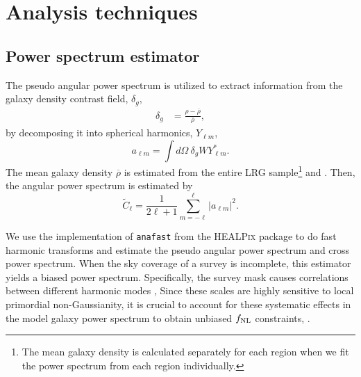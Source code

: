 \section{Analysis techniques}
\label{sec:method} 





\subsection{Power spectrum estimator}
The pseudo angular power spectrum \citep{hivon2002master} is utilized to extract information from the galaxy density contrast field, $\delta_{g}$, 
\begin{align}\label{eq:delta}
    \delta_{g} &= \frac{\rho- \overline{\rho}}{\overline{\rho}},
\end{align}
by decomposing it into spherical harmonics, $Y_{\ell m}$,
\begin{equation}
        a_{\ell m} = \int d\Omega ~ \delta_{g} W Y^{*}_{\ell m}.
\end{equation}
The mean galaxy density $\overline{\rho}$ is estimated from the entire LRG sample\footnote{The mean galaxy density is calculated separately for each region when we fit the power spectrum from each region individually.} and . Then, the angular power spectrum is estimated by
\begin{equation}\label{eq:pusedocell}
        \tilde{C}_{\ell} = \frac{1}{2\ell +1} \sum_{m=-\ell}^{\ell} |a_{\ell m}|^{2}.
\end{equation}

We use the implementation of \texttt{anafast} from the \textsc{HEALPix} package \citep{gorski2005healpix} to do fast harmonic transforms and estimate the pseudo angular power spectrum and cross power spectrum. When the sky coverage of a survey is incomplete, this estimator yields a biased power spectrum. Specifically, the survey mask causes correlations between different harmonic modes \citep{beutler2014clustering,wilson2017rapid},  Since these scales are highly sensitive to local primordial non-Gaussianity, it is crucial to account for these systematic effects in the model galaxy power spectrum to obtain unbiased $f_{\rm NL}$ constraints, .

